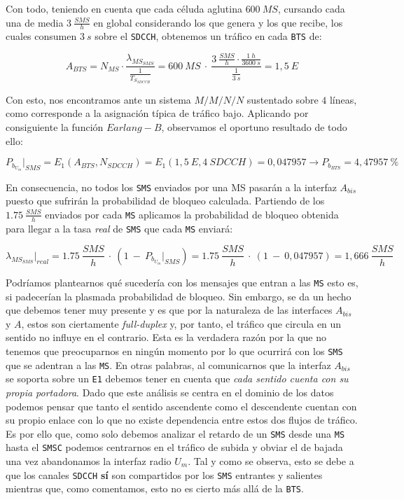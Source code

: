\documentclass[10pt]{article}
\begin{document}
			Con todo, teniendo en cuenta que cada céluda aglutina $600\ MS$, cursando cada una de media $3\ \frac{SMS}{h}$ en global considerando los que genera y los que recibe, los cuales consumen $3\ s$ sobre el \texttt{SDCCH}, obtenemos un tráfico en cada \texttt{BTS} de:

			$$A_{BTS} = N_{MS} \cdot \frac{\lambda_{MS_{SMS}}}{\frac{1}{T_{S_{SDCCH}}}} = 600\ MS\ \cdot\ \frac{3\ \frac{SMS}{h} \cdot \frac{1\ h}{3600\ s}}{\frac{1}{3\ s}} = 1,5\ E$$

			Con esto, nos encontramos ante un sistema $M/M/N/N$ sustentado sobre $4$ líneas, como corresponde a la asignación típica de tráfico bajo. Aplicando por consiguiente la función $Earlang-B$, observamos el oportuno resultado de todo ello:

			$$P_{b_{U_m}}\bigr\rvert_{SMS} = E_1(A_{BTS}, N_{SDCCH}) = E_1(1,5\ E, 4\ SDCCH) = 0,047957 \rightarrow P_{b_{BTS}} = 4,47957\ \%$$

			En consecuencia, no todos los \texttt{SMS} enviados por una MS pasarán a la interfaz $A_{bis}$ puesto que sufrirán la probabilidad de bloqueo calculada. Partiendo de los $1.75\ \frac{SMS}{h}$ enviados por cada \texttt{MS} aplicamos la probabilidad de bloqueo obtenida para llegar a la tasa \textit{real} de \texttt{SMS} que cada \texttt{MS} enviará:

			$$\lambda_{MS_{SMS}}\biggr\rvert_{real} = 1.75\ \frac{SMS}{h}\ \cdot\ (1\ -\ P_{b_{U_m}}\bigr\rvert_{SMS}) = 1.75\ \frac{SMS}{h}\ \cdot\ (1\ -\ 0,047957) = 1,666\ \frac{SMS}{h}$$

			Podríamos plantearnos qué sucedería con los mensajes que entran a las \texttt{MS} esto es, si padecerían la plasmada probabilidad de bloqueo. Sin embargo, se da un hecho que debemos tener muy presente y es que por la naturaleza de las interfaces $A_{bis}$ y $A$, estos son ciertamente \textit{full-duplex} y, por tanto, el tráfico que circula en un sentido no influye en el contrario. Esta es la verdadera razón por la que no tenemos que preocuparnos en ningún momento por lo que ocurrirá con los \texttt{SMS} que se adentran a las \texttt{MS}. En otras palabras, al comunicarnos que la interfaz $A_{bis}$ se soporta sobre un \texttt{E1} debemos tener en cuenta que \textit{cada sentido cuenta con su propia portadora}. Dado que este análisis se centra en el dominio de los datos podemos pensar que tanto el sentido ascendente como el descendente cuentan con su propio enlace con lo que no existe dependencia entre estos dos flujos de tráfico. Es por ello que, como solo debemos analizar el retardo de un \texttt{SMS} desde una \texttt{MS} hasta el \texttt{SMSC} podemos centrarnos en el tráfico de subida y obviar el de bajada una vez abandonamos la interfaz radio $U_m$. Tal y como se observa, esto se debe a que los canales \texttt{SDCCH} \textbf{sí} son compartidos por los \texttt{SMS} entrantes y salientes mientras que, como comentamos, esto no es cierto más allá de la \texttt{BTS}.
\end{document}
